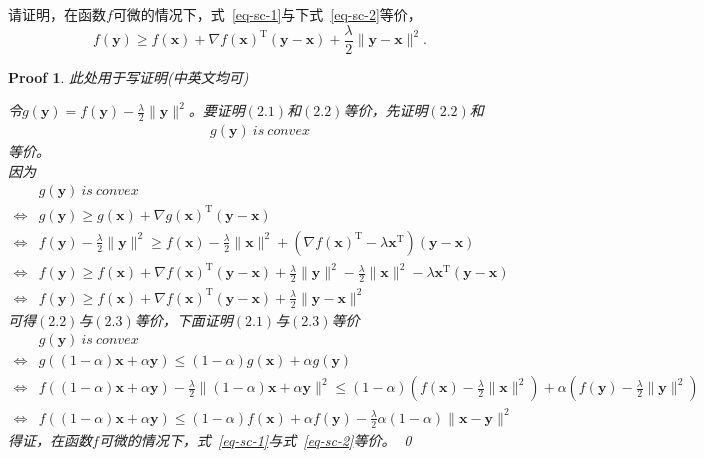 \documentclass[a4paper,UTF8]{article}
\numberwithin{equation}{section}
\newtheorem*{myProof}{Proof}
\begin{document}
请证明，在函数$f$可微的情况下，式~\eqref{eq-sc-1}与下式~\eqref{eq-sc-2}等价，
\begin{equation}
  \label{eq-sc-2}
  f(\mathbf{y}) \geq f(\mathbf{x}) + \nabla f(\mathbf{x})^\mathrm{T}(\mathbf{y}-\mathbf{x}) + \frac{\lambda}{2}\lVert \mathbf{y} - \mathbf{x}\rVert^2.
\end{equation}
\begin{myProof}
此处用于写证明(中英文均可)

令$g(\mathbf{y}) = f(\mathbf{y}) - \frac{\lambda}{2}\lVert \mathbf{y}\rVert^2$。要证明$(2.1)$和$(2.2)$等价，先证明$(2.2)$和
\begin{equation}
\begin{aligned}
g(\mathbf{y})\ is\ convex
\end{aligned}
\end{equation}
等价。\\
因为
\begin{equation}
\begin{aligned}
&g(\mathbf{y})\ is\ convex \\
\Leftrightarrow &g(\mathbf{y}) \geq g(\mathbf{x}) + \nabla g(\mathbf{x})^\mathrm{T}(\mathbf{y}-\mathbf{x})\\
\Leftrightarrow &f(\mathbf{y}) - \frac{\lambda}{2}\lVert \mathbf{y}\rVert^2 \geq f(\mathbf{x}) - \frac{\lambda}{2}\lVert \mathbf{x}\rVert^2 + (\nabla f(\mathbf{x})^\mathrm{T} - \lambda\mathbf{x}^\mathrm{T})(\mathbf{y} - \mathbf{x})\\
\Leftrightarrow &f(\mathbf{y}) \geq f(\mathbf{x}) + \nabla f(\mathbf{x})^\mathrm{T}(\mathbf{y} - \mathbf{x}) + \frac{\lambda}{2}\lVert \mathbf{y} \rVert^2 - \frac{\lambda}{2}\lVert \mathbf{x} \rVert^2 - \lambda \mathbf{x}^\mathrm{T}(\mathbf{y}-\mathbf{x})\\
\Leftrightarrow & f(\mathbf{y}) \geq f(\mathbf{x}) + \nabla f(\mathbf{x})^\mathrm{T}(\mathbf{y} - \mathbf{x}) + \frac{\lambda}{2}\lVert \mathbf{y}-\mathbf{x} \rVert^2
\end{aligned}
\end{equation}
可得$(2.2)$与$(2.3)$等价，下面证明$(2.1)$与$(2.3)$等价
\begin{equation}
\begin{aligned}
&g(\mathbf{y})\ is\ convex \\
\Leftrightarrow & g((1-\alpha)\mathbf{x} + \alpha\mathbf{y}) \leq (1-\alpha)g(\mathbf{x}) + \alpha g(\mathbf{y})\\
\Leftrightarrow & f((1-\alpha)\mathbf{x} + \alpha\mathbf{y}) - \frac{\lambda}{2}\lVert (1-\alpha)\mathbf{x} + \alpha\mathbf{y} \rVert^2 \leq (1-\alpha)(f(\mathbf{x})-\frac{\lambda}{2}\lVert \mathbf{x} \rVert^2) + \alpha(f(\mathbf{y}) - \frac{\lambda}{2}\lVert \mathbf{y} \rVert^2)\\
\Leftrightarrow & f((1-\alpha)\mathbf{x} + \alpha\mathbf{y})\leq (1-\alpha)f(\mathbf{x}) + \alpha f(\mathbf{y}) - \frac{\lambda}{2}\alpha(1-\alpha)\lVert \mathbf{x} - \mathbf{y}\rVert^2
\end{aligned}
\end{equation}
得证，在函数$f$可微的情况下，式~\eqref{eq-sc-1}与式~\eqref{eq-sc-2}等价。
\qed
\end{myProof}
\end{document}
